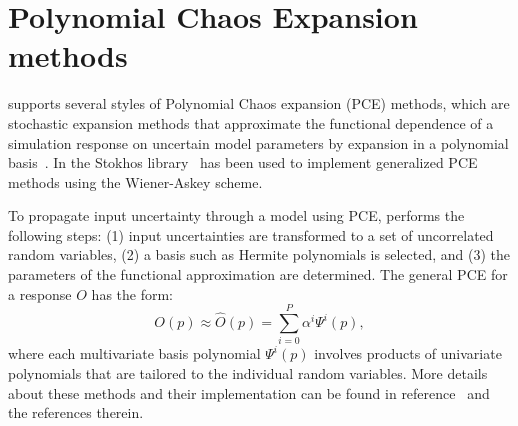 


\clearpage
\section{Polynomial Chaos Expansion methods}
\label{PCE_Analysis}
\label{pce_Overview}
  

\Xyce{} supports several styles of Polynomial Chaos expansion (PCE) methods, which are 
stochastic expansion methods that approximate the functional dependence
of a simulation response on uncertain model parameters by expansion
in a polynomial basis~\cite{XiuKarn02,Xiu2010}.   
In \Xyce{} the Stokhos library~\cite{stokhos} has been used to implement 
generalized PCE methods using the Wiener-Askey scheme\cite{XiuKarn02}.   

To propagate input uncertainty through a model using PCE, \Xyce{}
performs the following steps: (1) input uncertainties are transformed
to a set of uncorrelated random variables, (2) a basis such
as Hermite polynomials is selected, and (3) the parameters of the
functional approximation are determined.  The general PCE 
for a response $O$ has the form:
\begin{equation}
  O(p) \approx \hat{O}(p) = \sum_{i=0}^{P} \alpha^i \varPsi^i(p),
  \label{eq:genPCEresponse}
\end{equation}
where each multivariate basis polynomial $\varPsi^i(p)$ involves products of univariate
polynomials that are tailored to the individual random variables. 
More details about these methods and their \Xyce{} implementation can be found in
reference~\cite{xyceAdvancedUQ} and the references therein.

